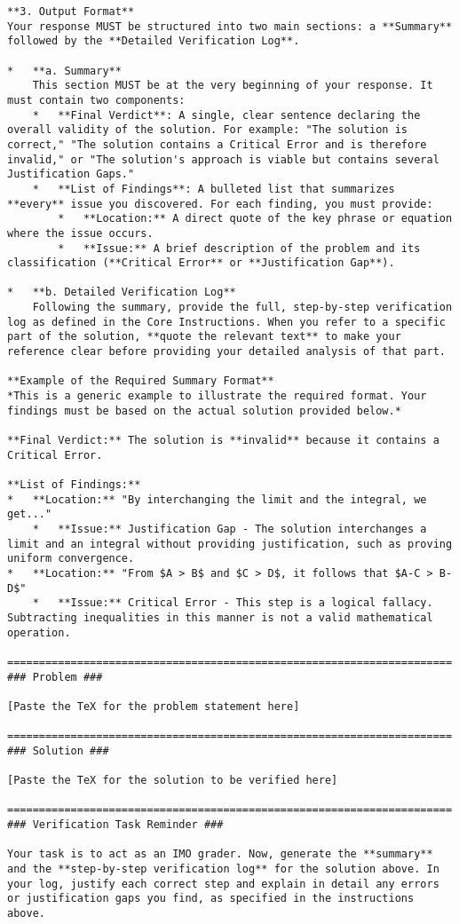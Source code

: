 \begin{lstlisting}
**3. Output Format**
Your response MUST be structured into two main sections: a **Summary** followed by the **Detailed Verification Log**.

*   **a. Summary**
    This section MUST be at the very beginning of your response. It must contain two components:
    *   **Final Verdict**: A single, clear sentence declaring the overall validity of the solution. For example: "The solution is correct," "The solution contains a Critical Error and is therefore invalid," or "The solution's approach is viable but contains several Justification Gaps."
    *   **List of Findings**: A bulleted list that summarizes **every** issue you discovered. For each finding, you must provide:
        *   **Location:** A direct quote of the key phrase or equation where the issue occurs.
        *   **Issue:** A brief description of the problem and its classification (**Critical Error** or **Justification Gap**).

*   **b. Detailed Verification Log**
    Following the summary, provide the full, step-by-step verification log as defined in the Core Instructions. When you refer to a specific part of the solution, **quote the relevant text** to make your reference clear before providing your detailed analysis of that part.

**Example of the Required Summary Format**
*This is a generic example to illustrate the required format. Your findings must be based on the actual solution provided below.*

**Final Verdict:** The solution is **invalid** because it contains a Critical Error.

**List of Findings:**
*   **Location:** "By interchanging the limit and the integral, we get..."
    *   **Issue:** Justification Gap - The solution interchanges a limit and an integral without providing justification, such as proving uniform convergence.
*   **Location:** "From $A > B$ and $C > D$, it follows that $A-C > B-D$"
    *   **Issue:** Critical Error - This step is a logical fallacy. Subtracting inequalities in this manner is not a valid mathematical operation.

======================================================================
### Problem ###

[Paste the TeX for the problem statement here]

======================================================================
### Solution ###

[Paste the TeX for the solution to be verified here]

======================================================================
### Verification Task Reminder ###

Your task is to act as an IMO grader. Now, generate the **summary** and the **step-by-step verification log** for the solution above. In your log, justify each correct step and explain in detail any errors or justification gaps you find, as specified in the instructions above.
\end{lstlisting}

